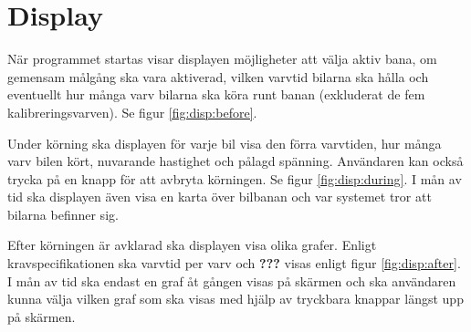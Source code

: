 \section{Display}

När programmet startas visar displayen möjligheter att välja aktiv bana, om
gemensam målgång ska vara aktiverad, vilken varvtid bilarna ska hålla och
eventuellt hur många varv bilarna ska köra runt banan (exkluderat de fem
kalibreringsvarven). Se figur \ref{fig:disp:before}.

Under körning ska displayen för varje bil visa den förra varvtiden, hur många
varv bilen kört, nuvarande hastighet och pålagd spänning. Användaren kan också
trycka på en knapp för att avbryta körningen. Se figur \ref{fig:disp:during}. I
mån av tid ska displayen även visa en karta över bilbanan och var systemet tror
att bilarna befinner sig.

Efter körningen är avklarad ska displayen visa olika grafer. Enligt
kravspecifikationen ska varvtid per varv och \textbf{???} visas enligt figur
\ref{fig:disp:after}. I mån av tid ska endast en graf åt gången visas på skärmen
och ska användaren kunna välja vilken graf som ska visas med hjälp av tryckbara
knappar längst upp på skärmen.

